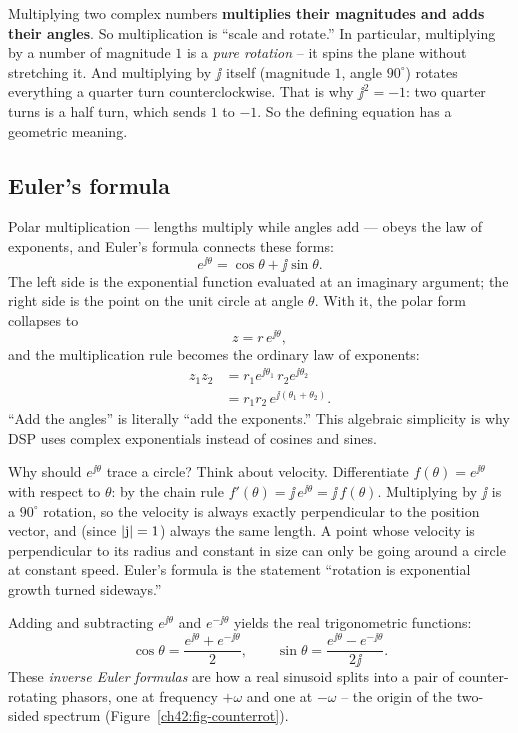 \begin{happeningbox}
Multiplying two complex numbers \textbf{multiplies their magnitudes and adds their angles}. So
multiplication is ``scale and rotate.'' In particular, multiplying by a number of magnitude $1$
is a \emph{pure rotation} -- it spins the plane without stretching it. And multiplying by $\jj$
itself (magnitude $1$, angle $90^\circ$) rotates everything a quarter turn counterclockwise. That
is why $\jj^2 = -1$: two quarter turns is a half turn, which sends $1$ to $-1$. So the defining
equation has a geometric meaning.
\end{happeningbox}

\subsection{Euler's formula}

Polar multiplication --- lengths multiply while angles add --- obeys the law of exponents, and Euler's formula connects these forms:
\[
  \boxed{\,e^{\jj\theta} = \cos\theta + \jj\sin\theta.\,}
\]
The left side is the exponential function evaluated at an imaginary argument; the right side is
the point on the unit circle at angle $\theta$. With it, the polar form collapses to
\[
  z = r\,e^{\jj\theta},
\]
and the multiplication rule becomes the ordinary law of exponents:
\begin{align*}
  z_1 z_2 &= r_1 e^{\jj\theta_1}\,r_2 e^{\jj\theta_2} \\
  &= r_1 r_2\, e^{\jj(\theta_1+\theta_2)}.
\end{align*}
``Add the angles'' is literally ``add the exponents.'' This algebraic simplicity is why DSP uses complex exponentials instead of cosines and sines.

\begin{whybox}
Why should $e^{\jj\theta}$ trace a circle? Think about velocity. Differentiate $f(\theta) =
e^{\jj\theta}$ with respect to $\theta$: by the chain rule $f'(\theta) = \jj\,e^{\jj\theta} =
\jj\,f(\theta)$. Multiplying by $\jj$ is a $90^\circ$ rotation, so the velocity is always
exactly perpendicular to the position vector, and (since $\lvert\mathrm{j}\rvert=1$) always the same length.
A point whose velocity is perpendicular to its radius and constant in size can only be going
around a circle at constant speed. Euler's formula is the statement ``rotation is exponential
growth turned sideways.''
\end{whybox}

Adding and subtracting $e^{\jj\theta}$ and $e^{-\jj\theta}$ yields the real trigonometric functions:
\[
  \cos\theta = \frac{e^{\jj\theta} + e^{-\jj\theta}}{2}, \qquad
  \sin\theta = \frac{e^{\jj\theta} - e^{-\jj\theta}}{2\jj}.
\]
These \emph{inverse Euler formulas} are how a real sinusoid splits into a pair of counter-rotating
phasors, one at frequency $+\omega$ and one at $-\omega$ -- the origin of the two-sided spectrum
(Figure~\ref{ch42:fig-counterrot}).

